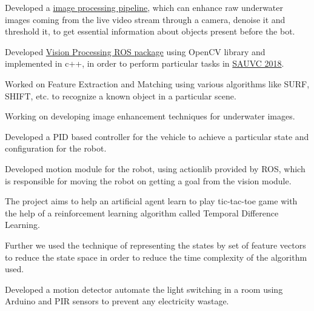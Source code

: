 \documentclass[]{deedy-resume-openfont}
\begin{document}
\begin{tightemize}
\item Developed a \href{https://github.com/ksakash/auv2017-1/blob/IP/task_handler_layer/ip.md}{image processing pipeline}, which can enhance raw underwater images coming from the live video stream through a camera, denoise it and threshold it, to get essential information about objects present before the bot. 
\item Developed \href{https://github.com/ksakash/IP_SAUVC/}{Vision Processing ROS package} using OpenCV library and implemented in c++, in order to perform particular tasks in \href{https://sauvc.org/}{SAUVC 2018}.  
\item Worked on Feature Extraction and Matching using various algorithms like SURF, SHIFT, etc. to recognize a known object in a particular scene.
\item Working on developing image enhancement techniques for underwater images.
\item Developed a PID based controller for the vehicle to achieve a particular state and configuration for the robot.
\item Developed motion module for the robot, using actionlib provided by ROS, which is responsible for moving the robot on getting a goal from the vision module.
\end{tightemize}
\sectionsep

\begin{tightemize}
\item The project aims to help an artificial agent learn to play tic-tac-toe game with the help of a  reinforcement learning algorithm called Temporal Difference Learning.
\item Further we used the technique of representing the states by set of feature vectors to reduce the state space in order to reduce the time complexity of the algorithm used.
\end{tightemize}
\sectionsep

\begin{tightemize}
\item Developed a motion detector automate the light switching in a room using Arduino and PIR sensors to prevent any electricity wastage.
\end{tightemize}
\end{document}
